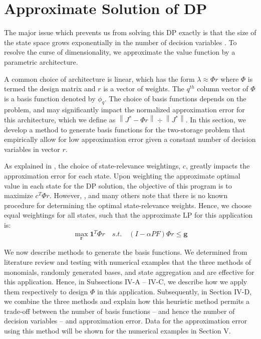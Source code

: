 \documentclass[conference]{IEEEtran}
\newcommand{\norm}[1]{\left\lVert#1\right\rVert}
\begin{document}
\section{Approximate Solution of DP}

The major issue which prevents us from solving this DP exactly is that the size of the state space grows exponentially in the number of decision variables \cite{deFarias:2003:LPA:970869.970918}. To resolve the curse of dimensionality, we approximate the value function by a parametric architecture. %

A common choice of architecture is linear, which has the form $\lambda\approx \Phi r$ where $\Phi$ is termed the design matrix and $r$ is a vector of weights. The $q^{th}$ column vector of $\Phi$ is a basis function denoted by $\phi_{q}$. The choice of basis functions depends on the problem, and may significantly impact the normalized approximation error for this architecture, which we define as $\norm{J^{*}-\Phi r}\div\norm{J^{*}}$. In this section, we develop a method to generate basis functions for the two-storage problem that empirically allow for low approximation error given a constant number of decision variables in vector $r$.

As explained in \cite{deFarias:2003:LPA:970869.970918}, the choice of state-relevance weightings, $c$, greatly impacts the approximation error for each state. Upon weighting the approximate optimal value in each state for the DP solution, the objective of this program is to maximize $c^{T}\Phi r$. However, \cite{deFarias:2003:LPA:970869.970918}, \cite{PatrascuReluEugen2004} and many others note that there is no known procedure for determining the optimal state-relevance weights. Hence, we choose equal weightings for all states, such that the approximate LP for this application is:
\begin{equation} \label{eq:ApproxLP}
    \max_{\boldsymbol{r}} \boldsymbol{1}^{T} \Phi r
    \hspace{1em}s.t.\hspace{1em}
    (I-\alpha PF)\Phi r \leq \boldsymbol{g}
\end{equation}

We now describe methods to generate the basis functions. We determined from literature review and testing with numerical examples that the three methods of monomials, randomly generated bases, and state aggregation and are effective for this application. Hence, in Subsections IV-A -- IV-C, we describe how we apply them respectively to design $\Phi$ in this application. Subsequently, in Section IV-D, we combine the three methods and explain how this heuristic method permits a trade-off between the number of basis functions -- and hence the number of decision variables -- and approximation error. Data for the approximation error using this method will be shown for the numerical examples in Section V.
\end{document}
